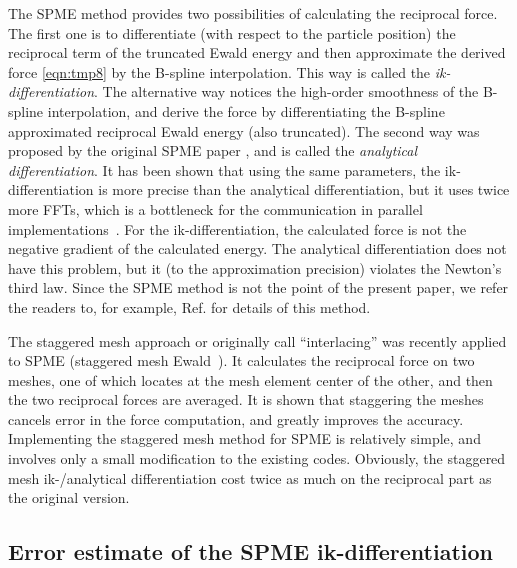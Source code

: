 \documentclass[aps,pre,preprint,unsortedaddress]{revtex4}
\newcommand{\redc}[1]{{\color{red} #1}}
\begin{document}
The SPME method provides two possibilities of calculating the
reciprocal force. The first one is to differentiate (with respect to
the particle position) the reciprocal term of the truncated Ewald
energy and then approximate the derived force \eqref{eqn:tmp8} by the
B-spline interpolation. This way is called the
\emph{ik-differentiation}.
The alternative way notices the high-order
smoothness of the B-spline interpolation, and derive the force by
differentiating the B-spline approximated reciprocal Ewald energy
(also truncated). The second way was proposed by the original SPME paper
\cite{essmann1995spm}, and is called the \emph{analytical
  differentiation}.
It has been shown that using the same parameters,
the ik-differentiation is more precise than the analytical
differentiation, but it uses twice more FFTs, which is a bottleneck
for the communication in parallel
implementations~\cite{wang2010optimizing}.
For the ik-differentiation, the calculated force is not the negative
gradient of the calculated energy. The analytical differentiation
does not have this problem, but it (to the approximation precision)
violates the Newton's third law.
Since the SPME method is
not the point of the present paper, we refer the readers to, for
example, Ref. \cite{essmann1995spm, deserno1998mue1,
  wang2010optimizing} for details of this method.

The staggered mesh approach or originally call ``interlacing'' was
recently applied to SPME (staggered mesh Ewald~\cite{cerutti2009staggered}).
It calculates the
reciprocal force on two meshes,
one of which locates at the mesh element center
of the other, and then the two reciprocal forces are averaged.
It is shown that staggering the meshes
cancels error in the force computation, and greatly improves the
accuracy.
Implementing the staggered mesh method for SPME is
relatively simple, and involves only \redc{a small} modification to the
existing codes.
Obviously, the staggered mesh ik-/analytical differentiation
cost twice as much on the
reciprocal part as the original version.

\subsection{Error estimate of the SPME ik-differentiation}
\label{sec:error-ik}
\end{document}
